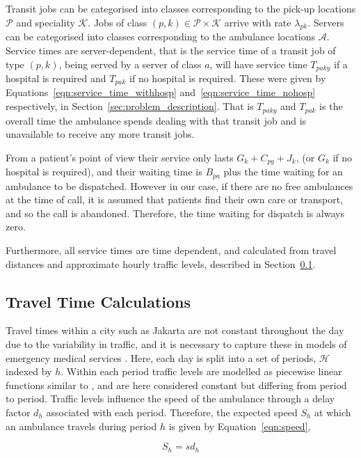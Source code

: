 \documentclass[numbers,webpdf,imaman]{ima-authoring-template}%
\begin{document}
Transit jobs can be categorised into classes corresponding to the pick-up
locations $\mathcal{P}$ and speciality $\mathcal{K}$. Jobs of class
$(p, k) \in \mathcal{P} \times \mathcal{K}$ arrive with rate $\lambda_{pk}$.
Servers can be categorised into classes corresponding to the ambulance
locations $\mathcal{A}$. Service times are server-dependent, that is the
service time of a transit job of type $(p, k)$, being served by a server of
class $a$, will have service time $T_{paky}$ if a hospital is required and
$T_{pak}$ if no hospital is required. These were given by
Equations~\ref{eqn:service_time_withhosp} and~\ref{eqn:service_time_nohosp}
respectively, in Section~\ref{sec:problem_description}.
That is $T_{paky}$ and $T_{pak}$ is the overall time the ambulance spends
dealing with that transit job and is unavailable to receive any more transit
jobs.

From a patient's point of view their service only lasts $G_k + C_{py} + J_k$,
(or $G_k$ if no hospital is required), and their waiting time is $B_{pa}$ plus
the time waiting for an ambulance to be dispatched. However in our case, if
there are no free ambulances at the time of call, it is assumed that patients
find their own care or transport, and so the call is abandoned. Therefore, the
time waiting for dispatch is always zero.

Furthermore, all service times are time dependent, and calculated from travel
distances and approximate hourly traffic levels, described in
Section~\ref{sec:travel_times}.

\subsection{Travel Time Calculations}\label{sec:travel_times}
Travel times within a city such as Jakarta are not constant throughout the day
due to the variability in traffic, and it is necessary to capture these in
models of emergency medical services \citep{schmiddoerner10}.
Here, each day is split into a set of periods, $\mathcal{H}$ indexed by $h$.
Within each period traffic levels are modelled as piecewise linear functions
similar to \citet{horn00}, and are here considered constant but differing from
period to period. Traffic levels influence the speed of the ambulance through a
delay factor $d_h$ associated with each period. Therefore, the expected speed
$S_h$ at which an ambulance travels during period $h$ is given by
Equation~\ref{eqn:speed},

\begin{equation}\label{eqn:speed}
S_h = s d_h
\end{equation}
\end{document}

